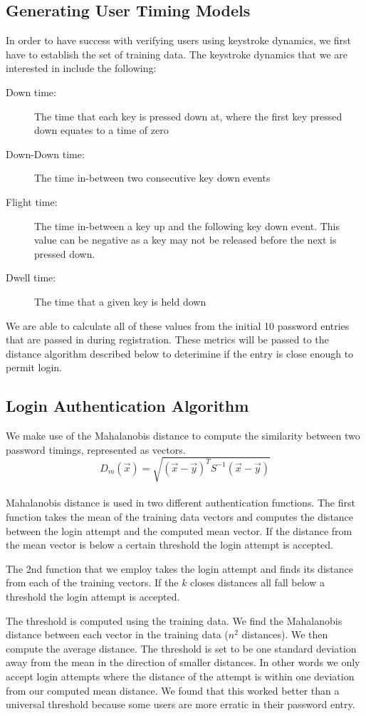 \documentclass{article}
\begin{document}
\subsection{Generating User Timing Models}
In order to have success with verifying users using keystroke dynamics, we first have to establish the set of training data. The keystroke dynamics that we are interested in include the following:
\begin{description}
	\item[Down time:] The time that each key is pressed down at, where the first key pressed down equates to a time of zero
	\item[Down-Down time:] The time in-between two consecutive key down events
	\item[Flight time:] The time in-between a key up and the following key down event. This value can be negative as a key may not be released before the next is pressed down. 
	\item[Dwell time:] The time that a given key is held down
\end{description}
We are able to calculate all of these values from the initial 10 password entries that are passed in during registration. These metrics will be passed to the distance algorithm described below to deterimine if the entry is close enough to permit login.

\subsection{Login Authentication Algorithm}
We make use of the Mahalanobis distance to compute the similarity between two password timings, represented as vectors.  \\
\begin{displaymath}
D_m(\vec{x}) = \sqrt{(\vec{x}-\vec{y})^T S^{-1} (\vec{x}-\vec{y})}
\end{displaymath} \\
Mahalanobis distance is used in two different authentication functions. The first function takes the mean of the training data vectors and computes the distance between the login attempt and the computed mean vector. If the distance from the mean vector is below a certain threshold the login attempt is accepted. 

The 2nd function that we employ takes the login attempt and finds its distance from each of the training vectors. If the $k$ closes distances all fall below a threshold the login attempt is accepted.
 
The threshold is computed using the training data. We find the Mahalanobis distance between each vector in the training data ($n^2$ distances). We then compute the average distance. The threshold is set to be one standard deviation away from the mean in the direction of smaller distances. In other words we only accept login attempts where the distance of the attempt is within one deviation from our computed mean distance. We found that this worked better than a universal threshold because some users are more erratic in their password entry.
\end{document}
